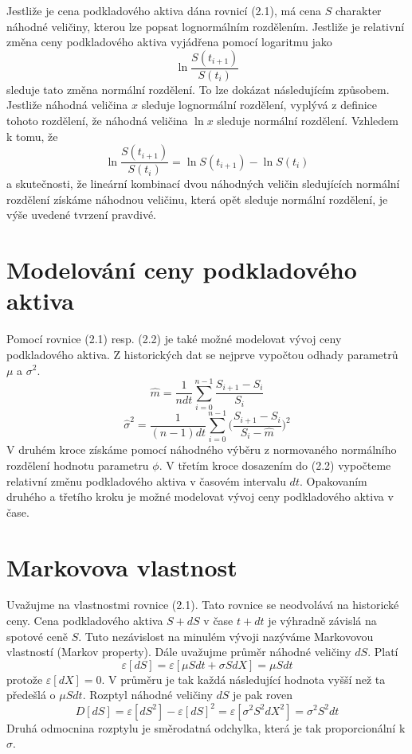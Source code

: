 \documentclass[a4paper]{book}
\begin{document}
Jestliže je cena podkladového aktiva dána rovnicí (2.1), má cena $S$ charakter náhodné veličiny, kterou lze popsat lognormálním rozdělením. Jestliže je relativní změna ceny podkladového aktiva vyjádřena pomocí logaritmu jako
\begin{equation*}
\ln \frac{S(t_{i+1})}{S(t_i)}
\end{equation*}
sleduje tato změna normální rozdělení. To lze dokázat následujícím způsobem. Jestliže náhodná veličina $x$ sleduje lognormální rozdělení, vyplývá z definice tohoto rozdělení, že náhodná veličina $\ln x$ sleduje normální rozdělení. Vzhledem k tomu, že
\begin{equation*}
\ln \frac{S(t_{i+1})}{S(t_i)} = \ln S(t_{i+1}) - \ln S(t_{i})
\end{equation*}
a skutečnosti, že lineární kombinací dvou náhodných veličin sledujících normální rozdělení získáme náhodnou veličinu, která opět sleduje normální rozdělení, je výše uvedené tvrzení pravdivé.

\section{Modelování ceny podkladového aktiva}

Pomocí rovnice (2.1) resp. (2.2) je také možné modelovat vývoj ceny podkladového aktiva. Z historických dat se nejprve vypočtou odhady parametrů $\mu$ a $\sigma^2$.
\begin{equation*}
\hat{m} = \frac{1}{n dt}\sum^{n-1}_{i=0}\frac{S_{i+1}-S_i}{S_i}
\end{equation*}
\begin{equation*}
\hat{\sigma}^2 = \frac{1}{(n-1) dt}\sum^{n-1}_{i=0}\Big(\frac{S_{i+1}-S_i}{S_i-\hat{m}}\Big)^2
\end{equation*}
V druhém kroce získáme pomocí náhodného výběru z normovaného normálního rozdělení hodnotu parametru $\phi$. V třetím kroce dosazením do (2.2) vypočteme relativní změnu podkladového aktiva v časovém intervalu $dt$. Opakovaním druhého a třetího kroku je možné modelovat vývoj ceny podkladového aktiva v čase.

\section{Markovova vlastnost}

Uvažujme na vlastnostmi rovnice (2.1). Tato rovnice se neodvolává na historické ceny. Cena podkladového aktiva $S + dS$ v čase $t + dt$ je výhradně závislá na spotové ceně $S$. Tuto nezávislost na minulém vývoji nazýváme Markovovou vlastností (Markov property). Dále uvažujme průměr náhodné veličiny $dS$. Platí
\begin{equation*}
\varepsilon[dS]=\varepsilon[\mu S dt + \sigma S dX]=\mu S dt
\end{equation*}
protože $\varepsilon[dX]=0$. V průměru je tak každá následující hodnota vyšší než ta předešlá o $\mu S dt$. Rozptyl náhodné veličiny $dS$ je pak roven
\begin{equation*}
D[dS]=\varepsilon[dS^2]-\varepsilon[dS]^2=\varepsilon[\sigma^2S^2dX^2]=\sigma^2S^2dt
\end{equation*}
Druhá odmocnina rozptylu je směrodatná odchylka, která je tak proporcionální k $\sigma$.
\end{document}
